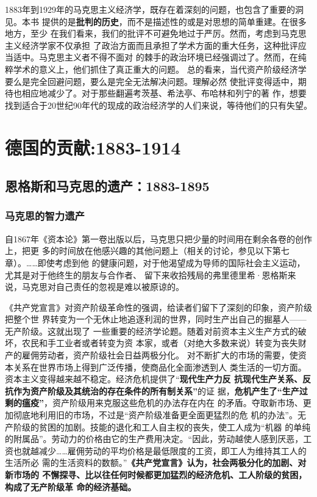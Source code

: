 1883年到1929年的马克思主义经济学，既存在着深刻的问题，也包含了重要的洞见。本书
提供的是\textbf{批判的历史}，而不是描述性的或是对思想的简单重建。在很多地方，至少
在我们看来，我们的批评不可避免地过于严厉。然而，考虑到马克思主义经济学家不仅承担
了政治方面而且承担了学术方面的重大任务，这种批评应当适中。马克思主义者不得不面对
的棘手的政治环境已经强调过了。然而，在纯粹学术的意义上，他们抓住了真正重大的问题。
总的看来，当代资产阶级经济学要么是完全回避问题，要么是完全无法解决问题。理解必然
使批评变得适中，期待也相应地减少了。对于那些翻遍考茨基、希法亭、布哈林和列宁的著
作，想要找到适合于20世纪90年代的现成的政治经济学的人们来说，等待他们的只有失望。

\part{德国的贡献:1883-1914}
\label{part:germany}

\chapter{恩格斯和马克思的遗产：1883-1895}
\label{chap:engels}

\section{马克思的智力遗产}

自1867年《资本论》第一卷出版以后，马克思只把少量的时间用在剩余各卷的创作上，把更
多的时间放在他感兴趣的其他问题上（相关的讨论，参见以下第七章）。……即使考虑到他
的健康问题，对于他渴望成为导师的国际社会主义运动，尤其是对于他终生的朋友与合作者、
留下来收拾残局的弗里德里希·恩格斯来说，马克思对自己责任的忽视是难以被原谅的。

《共产党宣言》对资产阶级革命性的强调，给读者们留下了深刻的印象，资产阶级把整个世
界转变为一个无休止地追逐利润的世界，同时生产出自己的掘墓人——无产阶级。这就出现了
一些重要的经济学论题。随着对前资本主义生产方式的破坏，农民和手工业者或者转变为资
本家，或者（对绝大多数来说）转变为丧失财产的雇佣劳动者，资产阶级社会日益两极分化。
对不断扩大的市场的需要，使资本关系在世界市场上得到广泛传播，使商品化全面渗透到人
类生活的一切方面。资本主义变得越来越不稳定。经济危机提供了“\textbf{现代生产力反
  抗现代生产关系、反抗作为资产阶级及其统治的存在条件的所有制关系”}的证
据，\textbf{危机产生了“生产过剩的瘟疫”}，资产阶级用来克服这些危机的办法存在内在
的矛盾。夺取新市场、更加彻底地利用旧的市场，不过是“资产阶级准备更全面更猛烈的危
机的办法”。无产阶级的贫困的加剧。技能的退化和工人自主权的丧失，使工人成为“机器
的单纯的附属品”。劳动力的价格由它的生产费用决定。“因此，劳动越使人感到厌恶，工
资也就越减少……雇佣劳动的平均价格是最低限度的工资，即工人为维持其工人的生活所必
需的生活资料的数额。”\textbf{《共产党宣言》认为，社会两极分化的加剧、对新市场的
  不懈探寻、比以往任何时候都更加猛烈的经济危机、工人阶级的贫困，构成了无产阶级革
  命的经济基础。}

